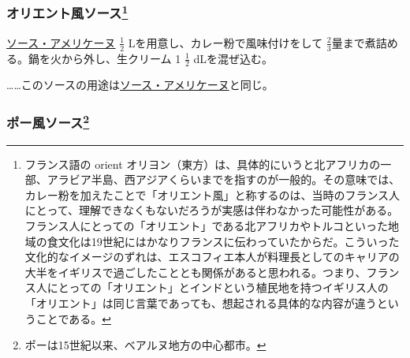 \begin{recette}
\atoaki{}

\hypertarget{sauce-orientale}{%
\subsubsection[オリエント風ソース]{\texorpdfstring{オリエント風ソース\footnote{フランス語の
  orient
  オリヨン（東方）は、具体的にいうと北アフリカの一部、アラビア半島、西アジアくらいまでを指すのが一般的。その意味では、カレー粉を加えたことで「オリエント風」と称するのは、当時のフランス人にとって、理解できなくもないだろうが実感は伴わなかった可能性がある。フランス人にとっての「オリエント」である北アフリカやトルコといった地域の食文化は19世紀にはかなりフランスに伝わっていたからだ。こういった文化的なイメージのずれは、エスコフィエ本人が料理長としてのキャリアの大半をイギリスで過ごしたこととも関係があると思われる。つまり、フランス人にとっての「オリエント」とインドという植民地を持つイギリス人の「オリエント」は同じ言葉であっても、想起される具体的な内容が違うということである。}}{オリエント風ソース}}\label{sauce-orientale}}



\protect\hyperlink{sauce-americaine}{ソース・アメリケーヌ}
\(\frac{1}{2}\) Lを用意し、カレー粉で風味付けをして
\(\frac{2}{3}\)量まで煮詰める。鍋を火から外し、生クリーム 1
\(\frac{1}{2}\) dLを混ぜ込む。

\ldots{}\ldots{}このソースの用途は\protect\hyperlink{sauce-americaine}{ソース・アメリケーヌ}と同じ。

\atoaki{}

\hypertarget{sauce-paloise}{%
\subsubsection[ポー風ソース]{\texorpdfstring{ポー風ソース\footnote{ポーは15世紀以来、ベアルヌ地方の中心都市。}}{ポー風ソース}}\label{sauce-paloise}}


 


\end{recette}
